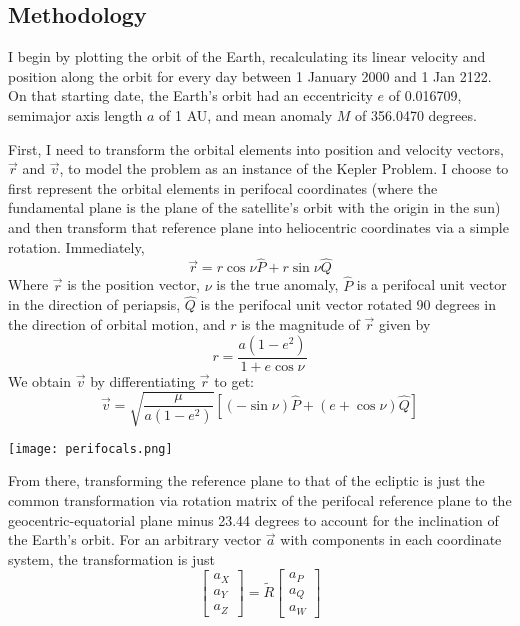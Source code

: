 \documentclass[12pt]{article}
\begin{document}
\subsection{Methodology}
I begin by plotting the orbit of the Earth, recalculating its linear velocity and position along the orbit for every day between 1 January 2000 and 1 Jan 2122. On that starting date, the Earth's orbit had an eccentricity $e$ of 0.016709, semimajor axis length $a$ of 1 AU, and mean anomaly $M$ of 356.0470 degrees. 

First, I need to transform the orbital elements into position and velocity vectors, $\vec{r}$ and $\vec{v}$, to model the problem as an instance of the Kepler Problem. I choose to first represent the orbital elements in perifocal coordinates (where the fundamental plane is the plane of the satellite's orbit with the origin in the sun) and then transform that reference plane into heliocentric coordinates via a simple rotation. Immediately, 
$$\vec{r} = r \cos \nu \hat{P} + r \sin \nu \hat{Q}$$
Where $\vec{r}$ is the position vector, $\nu$ is the true anomaly, $\hat{P}$ is a perifocal unit vector in the direction of periapsis, $\hat{Q}$ is the perifocal unit vector rotated 90 degrees in the direction of orbital motion, and $r$ is the magnitude of $\vec{r}$ given by 
$$r = \frac{a(1 - e^2)}{1 + e \cos \nu}$$
We obtain $\vec{v}$ by differentiating $\vec{r}$ to get:
$$\vec{v} = \sqrt{\frac{\mu}{a(1- e^2)}} [(-\sin \nu) \hat{P} + (e + \cos \nu) \hat{Q}]$$

\begin{center}
    \texttt{[image: perifocals.png]}
\end{center}

From there, transforming the reference plane to that of the ecliptic is just the common transformation via rotation matrix of the perifocal reference plane to the geocentric-equatorial plane minus 23.44 degrees to account for the inclination of the Earth's orbit. For an arbitrary vector $\vec{a}$ with components in each coordinate system, the transformation is just 
$$\begin{bmatrix}
    a_X\\
    a_Y\\
    a_Z
\end{bmatrix} = \tilde{R} \begin{bmatrix}
    a_P\\
    a_Q\\
    a_W
\end{bmatrix}$$
\end{document}
